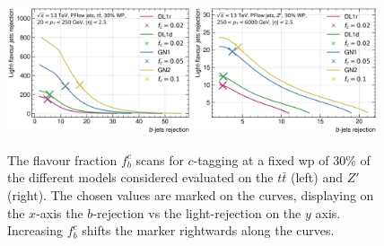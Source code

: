 \begin{figure}[h!]
  \centering
  \includegraphics[width=0.48\textwidth]{Images/FTAG/GN/GN2/fraction_scans/FractionScanPlot_tt_c.png}
  \includegraphics[width=0.48\textwidth]{Images/FTAG/GN/GN2/fraction_scans/FractionScanPlot_zp_c.png}
  \caption{The flavour fraction $f^c_b$ scans for $c$-tagging at a fixed \gls{wp} of 30\% of the different models considered evaluated on the $t\bar{t}$ (left) and $Z'$ (right). The chosen values are marked on the curves, displaying on the $x$-axis the $b$-rejection vs the light-rejection on the $y$ axis. Increasing $f^c_b$ shifts the marker rightwards along the curves. }
  \label{fig:GNxscansfb}
\end{figure} 

